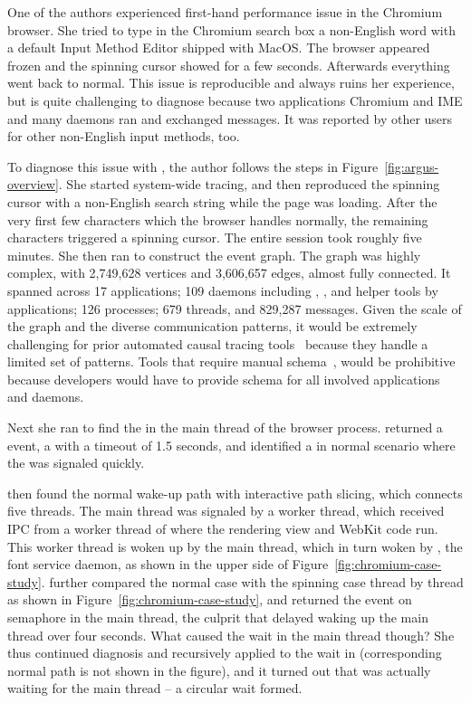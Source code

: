 One of the authors experienced first-hand performance issue
in the Chromium browser. She tried to type in
the Chromium search box a non-English word with a default Input Method Editor
shipped with MacOS. The browser appeared frozen and the spinning cursor showed
for a few seconds. Afterwards everything went back to normal. This issue is
reproducible and always ruins her experience, but is quite challenging to
diagnose because two applications Chromium and IME and many daemons ran and
exchanged messages. It was reported by other users for other non-English input
methods, too.

To diagnose this issue with \xxx, the author follows the steps in
Figure~\ref{fig:argus-overview}. She started system-wide tracing, and then
reproduced the spinning cursor with a non-English search string while the
page was loading. After the very first few characters which the browser
handles normally, the remaining characters triggered a spinning cursor. The
entire session took roughly five minutes. She then ran \xxx to construct
the event graph. The graph was highly complex, with 2,749,628 vertices and
3,606,657 edges, almost fully connected. It spanned across 17 applications;
109 daemons including , ,  and
helper tools by applications; 126 processes; 679 threads, and 829,287
messages. Given the scale of the graph and the diverse communication patterns,
it would be extremely challenging for prior automated causal tracing
tools~\cite{aguilera2003performance, zhang2013panappticon, attariyan2012x,
cohen2004correlating} because they handle a limited set of patterns. Tools
that require manual schema~\cite{barham2004using, reynolds2006pip}, would be
prohibitive because developers would have to provide schema for all involved
applications and daemons.

Next she ran \xxx to find the \spinningnode in the main thread of the browser
process. \xxx returned a  event, a  with a
timeout of 1.5 seconds, and identified a \similarnode in normal scenario where
the  was signaled quickly.

\xxx then found the normal wake-up path with interactive path slicing,
which connects five threads. The  main thread was signaled
by a  worker thread, which received IPC from a worker thread
of  where the rendering view and WebKit code run. This
worker thread is woken up by the  main thread, which in
turn woken by , the font service daemon, as shown in the upper
side of Figure~\ref{fig:chromium-case-study}. \xxx further compared
the normal case with the spinning case thread by thread as shown in
Figure~\ref{fig:chromium-case-study}, and returned the  event on
semaphore in the  main thread, the culprit that delayed waking up
the  main thread over four seconds. What caused the wait in the
 main thread though? She thus continued diagnosis and recursively
applied \xxx to the wait in (corresponding normal path is not shown
in the figure), and it turned out that  was actually waiting for
the  main thread -- a circular wait formed.

